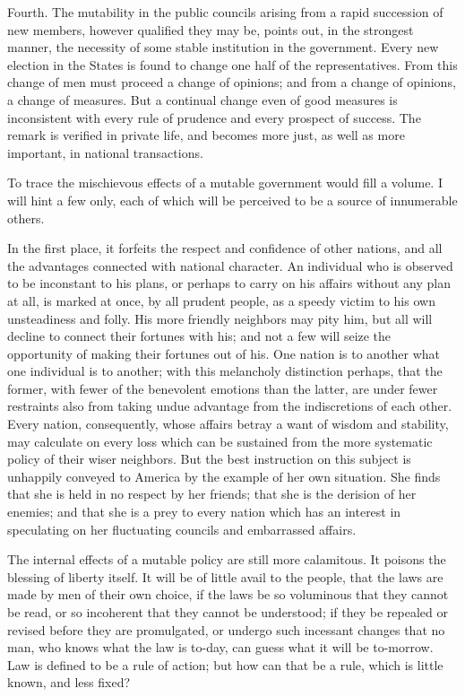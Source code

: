 Fourth. The mutability in the public councils arising from a rapid succession of new members, however qualified they may be, points out, in the strongest manner, the necessity of some stable institution in the government. Every new election in the States is found to change one half of the representatives. From this change of men must proceed a change of opinions; and from a change of opinions, a change of measures. But a continual change even of good measures is inconsistent with every rule of prudence and every prospect of success. The remark is verified in private life, and becomes more just, as well as more important, in national transactions.

To trace the mischievous effects of a mutable government would fill a volume. I will hint a few only, each of which will be perceived to be a source of innumerable others.

In the first place, it forfeits the respect and confidence of other nations, and all the advantages connected with national character. An individual who is observed to be inconstant to his plans, or perhaps to carry on his affairs without any plan at all, is marked at once, by all prudent people, as a speedy victim to his own unsteadiness and folly. His more friendly neighbors may pity him, but all will decline to connect their fortunes with his; and not a few will seize the opportunity of making their fortunes out of his. One nation is to another what one individual is to another; with this melancholy distinction perhaps, that the former, with fewer of the benevolent emotions than the latter, are under fewer restraints also from taking undue advantage from the indiscretions of each other. Every nation, consequently, whose affairs betray a want of wisdom and stability, may calculate on every loss which can be sustained from the more systematic policy of their wiser neighbors. But the best instruction on this subject is unhappily conveyed to America by the example of her own situation. She finds that she is held in no respect by her friends; that she is the derision of her enemies; and that she is a prey to every nation which has an interest in speculating on her fluctuating councils and embarrassed affairs.

The internal effects of a mutable policy are still more calamitous. It poisons the blessing of liberty itself. It will be of little avail to the people, that the laws are made by men of their own choice, if the laws be so voluminous that they cannot be read, or so incoherent that they cannot be understood; if they be repealed or revised before they are promulgated, or undergo such incessant changes that no man, who knows what the law is to-day, can guess what it will be to-morrow. Law is defined to be a rule of action; but how can that be a rule, which is little known, and less fixed?


